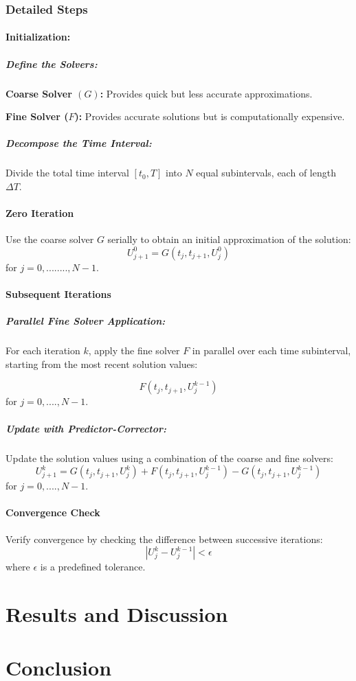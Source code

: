 \documentclass{article}
\begin{document}
   \subsubsection{Detailed Steps}
   
   \paragraph{Initialization:} 
     \subparagraph{Define the Solvers:}
     
     
        \textbf{Coarse Solver $(G)$:} Provides quick but less accurate approximations.
        
        \textbf{Fine Solver ($F$):} Provides accurate solutions but is computationally expensive.
        
     \subparagraph{Decompose the Time Interval:}
      Divide the total time interval 
   $[t_0,T]$ into
   $N$ equal subintervals, each of length 
   $\Delta T$. 
   \paragraph{Zero Iteration}
   Use the coarse solver $G$ serially to obtain an initial approximation of the solution:
    $$ U_{j+1}^0 = G(t_j,t_{j+1}, U_j^0)$$   for $j = 0, ........, N-1$.
   \paragraph{Subsequent Iterations} 
       \subparagraph{Parallel Fine Solver Application:} 
           For each iteration $k$, apply the fine solver $F$ in parallel over each time subinterval, starting from the most recent solution values:
   
   $$ F(t_j,t_{j+1}, U_j^{k-1})$$ for $j = 0, ....,N-1$.
        \subparagraph{Update with Predictor-Corrector:}
        Update the solution values using a combination of the coarse and fine solvers:
        $$ U_{j+1}^k = G(t_j,t_{j+1},U_j^k) + F(t_j,t_{j+1},U_j^{k-1}) -G(t_j,t_{j+1},U_j^{k-1})$$
        for $j = 0, .... ,N-1$.
        
    \paragraph{Convergence Check}
        Verify convergence by checking the difference between successive iterations:
      $$   | U_j^k - U_j^{k-1} | < \epsilon $$
   where $ \epsilon $ is a predefined tolerance. \cite{pararealwikipedia}

\section{Results and Discussion}


\section{Conclusion}



\end{document}
